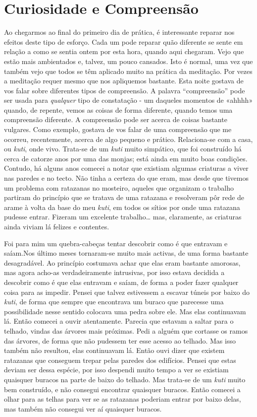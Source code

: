\chapter{Curiosidade e Compreensão}

Ao chegarmos ao final do primeiro dia de prática, é interessante reparar
nos efeitos deste tipo de esforço. Cada um pode reparar quão diferente
se sente em relação a como se sentia ontem por esta hora, quando aqui
chegaram. Vejo que estão mais ambientados e, talvez, um pouco cansados.
Isto é normal, uma vez que também vejo que todos se têm aplicado muito
na prática da meditação. Por vezes a meditação requer mesmo que nos
apliquemos bastante. Esta noite gostava de vos falar sobre diferentes
tipos de compreensão. A palavra ``compreensão'' pode ser usada para
\emph{qualquer} tipo de constatação - um daqueles momentos de «ahhhh»
quando, de repente, vemos as coisas de forma diferente, quando temos uma
compreensão diferente. A compreensão pode ser acerca de coisas bastante
vulgares. Como exemplo, gostava de vos falar de uma compreensão que me
ocorreu, recentemente, acerca de algo pequeno e prático. Relaciona-se
com a casa, ou \emph{kuti}, onde vivo. Trata-se de um \emph{kuti} muito
simpático, que foi construído há cerca de catorze anos por uma das
monjas; está ainda em muito boas condições. Contudo, há alguns anos
comecei a notar que existiam algumas criaturas a viver nas paredes e no
tecto. Não tinha a certeza do que eram, mas desde que tivemos um
problema com ratazanas no mosteiro, aqueles que organizam o trabalho
partiram do princípio que se tratava de uma ratazana e resolveram pôr
rede de arame à volta da base do meu \emph{kuti}, em todos os sítios por
onde uma ratazana pudesse entrar. Fizeram um excelente trabalho\ldots{}
mas, claramente, as criaturas ainda viviam lá felizes e contentes.

Foi para mim um quebra-cabeças tentar descobrir como é que entravam e
saíam.Nos último meses tornaram-se muito mais activas, de uma forma
bastante desagradável. Ao princípio costumava achar que elas eram
bastante amorosas, mas agora acho-as verdadeiramente intrusivas, por
isso estava decidida a descobrir como é que elas entravam e saíam, de
forma a poder fazer qualquer coisa para as impedir. Pensei que talvez
estivessem a escavar túneis por baixo do \emph{kuti}, de forma que
sempre que encontrava um buraco que parecesse uma possibilidade nesse
sentido colocava uma pedra sobre ele. Mas elas continuavam lá. Então
comecei a ouvir atentamente. Parecia que estavam a saltar para o
telhado, vindas das árvores mais próximas. Pedi a alguém que cortasse os
ramos das árvores, de forma que não pudessem ter esse acesso ao telhado.
Mas isso também não resultou, elas continuavam lá. Então ouvi dizer que
existem ratazanas que conseguem trepar pelas paredes dos edifícios.
Pensei que estas deviam ser dessa espécie, por isso despendi muito tempo
a ver se existiam quaisquer buracos na parte de baixo do telhado. Mas
trata-se de um \emph{kuti} muito bem construído, e não consegui
encontrar quaisquer buracos. Então comecei a olhar para as telhas para
ver se as ratazanas poderiam entrar por baixo delas, mas também não
consegui ver aí quaisquer buracos.

